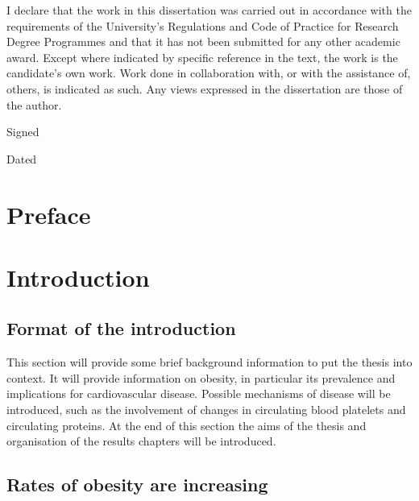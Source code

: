 \documentclass[11pt,twoside]{bristolthesis}
\begin{document}
  \begin{declaration}
    I declare that the work in this dissertation was carried out in accordance with the requirements of the University's Regulations and Code of Practice for Research Degree Programmes and that it has not been submitted for any other academic award. Except where indicated by specific reference in the text, the work is the candidate's own work. Work done in collaboration with, or with the assistance of, others, is indicated as such. Any views expressed in the dissertation are those of the author.

    \bigskip
    \bigskip
    \bigskip
    \bigskip
    \bigskip

    Signed

    \bigskip
    \bigskip
    \bigskip
    \bigskip
    \bigskip

    Dated
  \end{declaration}
  \hypersetup{linkcolor=black}
  \setcounter{tocdepth}{3}
  \tableofcontents
  \listoftables
  \listoffigures

\mainmatter %
\pagestyle{plain}
\hypertarget{preface}{%
\chapter*{Preface}\label{preface}}

\hypertarget{introduction}{%
\chapter{Introduction}\label{introduction}}

\hypertarget{format-of-the-introduction}{%
\section{Format of the introduction}\label{format-of-the-introduction}}

This section will provide some brief background information to put the thesis into context. It will provide information on obesity, in particular its prevalence and implications for cardiovascular disease. Possible mechanisms of disease will be introduced, such as the involvement of changes in circulating blood platelets and circulating proteins. At the end of this section the aims of the thesis and organisation of the results chapters will be introduced.

\hypertarget{rates-of-obesity-are-increasing}{%
\section{Rates of obesity are increasing}\label{rates-of-obesity-are-increasing}}
\end{document}
